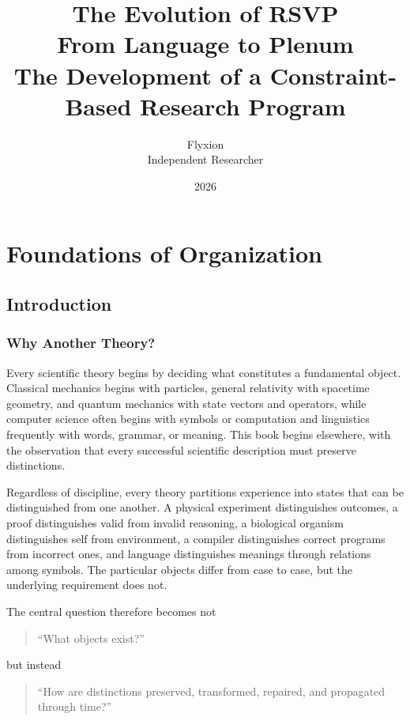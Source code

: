 \documentclass[11pt,oneside]{book}
\title{
The Evolution of RSVP\\[1em]
\Large
From Language to Plenum\\
The Development of a Constraint-Based
Research Program
}
\author{
Flyxion\\
Independent Researcher
}
\date{2026}
\numberwithin{equation}{chapter}
\theoremstyle{definition}
\theoremstyle{plain}
\begin{document}
\frontmatter

\maketitle

\tableofcontents


\mainmatter

\part{Foundations of Organization}

\chapter{Introduction}

\section{Why Another Theory?}

Every scientific theory begins by deciding what constitutes a fundamental object. Classical mechanics begins with particles, general relativity with spacetime geometry, and quantum mechanics with state vectors and operators, while computer science often begins with symbols or computation and linguistics frequently with words, grammar, or meaning. This book begins elsewhere, with the observation that every successful scientific description must preserve distinctions.

Regardless of discipline, every theory partitions experience into states that can be distinguished from one another. A physical experiment distinguishes outcomes, a proof distinguishes valid from invalid reasoning, a biological organism distinguishes self from environment, a compiler distinguishes correct programs from incorrect ones, and language distinguishes meanings through relations among symbols. The particular objects differ from case to case, but the underlying requirement does not.

The central question therefore becomes not

\begin{quote}
``What objects exist?''
\end{quote}

but instead

\begin{quote}
``How are distinctions preserved, transformed, repaired, and propagated
through time?''
\end{quote}
\end{document}
